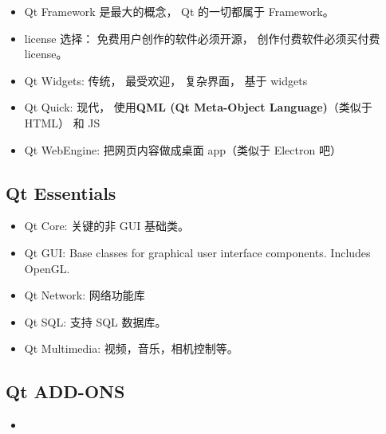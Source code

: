 
\begin{issues}
\issueDraft
\end{issues}

\begin{itemize}
\item Qt Framework 是最大的概念， Qt 的一切都属于 Framework。
\item license 选择： 免费用户创作的软件必须开源， 创作付费软件必须买付费 license。
\item Qt Widgets: 传统， 最受欢迎， 复杂界面， 基于 widgets
\item Qt Quick: 现代， 使用\textbf{QML (Qt Meta-Object Language)}（类似于 HTML） 和 JS
\item Qt WebEngine: 把网页内容做成桌面 app（类似于 Electron 吧）
\end{itemize}


\subsection{Qt Essentials}
\begin{itemize}
\item Qt Core: 关键的非 GUI 基础类。
\item Qt GUI: Base classes for graphical user interface components. Includes OpenGL.
\item Qt Network: 网络功能库
\item Qt SQL: 支持 SQL 数据库。
\item Qt Multimedia: 视频，音乐，相机控制等。
\end{itemize}

\subsection{Qt ADD-ONS}
\begin{itemize}
\item 
\end{itemize}
